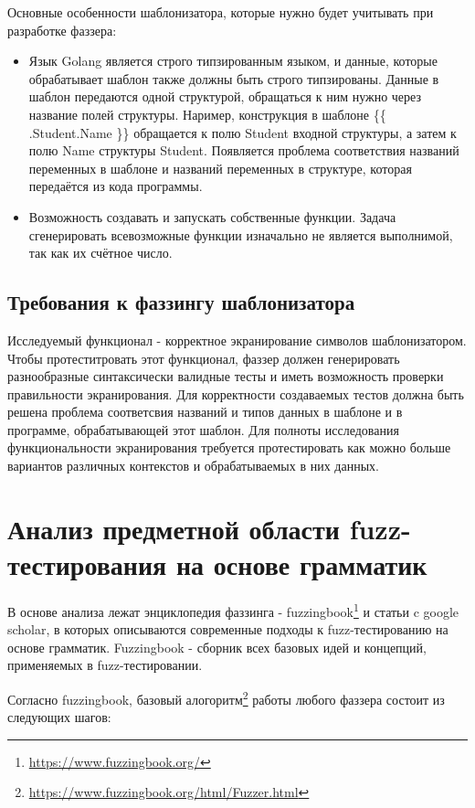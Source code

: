 \documentclass[a4paper]{article}
\begin{document}
Основные особенности шаблонизатора, которые нужно будет учитывать при разработке фаззера:

\begin{itemize}
    \item Язык Golang является строго типзированным языком, и данные, которые обрабатывает шаблон также должны быть строго типзированы. Данные в шаблон передаются одной структурой, обращаться к ним нужно через название полей структуры. Наример, конструкция в шаблоне \{\{ .Student.Name \}\} обращается к полю Student входной структуры, а затем к полю Name структуры Student. Появляется проблема соответствия названий переменных в шаблоне и названий переменных в структуре, которая передаётся из кода программы. 
    \item Возможность создавать и запускать собственные функции. Задача сгенерировать всевозможные функции изначально не является выполнимой, так как их счётное число.
\end{itemize}

\subsection{Требования к фаззингу шаблонизатора}

Исследуемый функционал - корректное экранирование символов шаблонизатором. Чтобы протеститровать этот функционал, фаззер должен генерировать разнообразные синтаксически валидные тесты и иметь возможность проверки правильности экранирования. Для корректности создаваемых тестов должна быть решена проблема соответсвия названий и типов данных в шаблоне и в программе, обрабатывающей этот шаблон. Для полноты исследования функциональности экранирования требуется протестировать как можно больше вариантов различных контекстов и обрабатываемых в них данных.

\newpage
\section{Анализ предметной области fuzz-тестирования на основе грамматик}
\indent

В основе анализа лежат энциклопедия фаззинга - fuzzingbook\footnote{\href{https://www.fuzzingbook.org/}{https://www.fuzzingbook.org/}} и статьи c google scholar, в которых описываются современные подходы к fuzz-тестированию на основе грамматик. Fuzzingbook - сборник всех базовых идей и концепций, применяемых в fuzz-тестировании.

Согласно fuzzingbook, базовый алогоритм\footnote{\href{https://www.fuzzingbook.org/html/Fuzzer.html}{https://www.fuzzingbook.org/html/Fuzzer.html}} работы любого фаззера состоит из следующих шагов:
\end{document}
